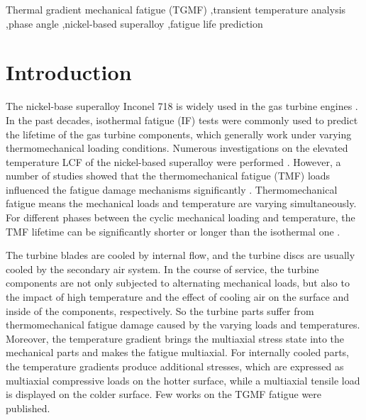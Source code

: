 \documentclass[preprint,5p,twocolumn,10pt,sort&compress]{elsarticle}
\begin{document}
\begin{frontmatter}
%
\begin{keyword}
Thermal gradient mechanical fatigue (TGMF) \sep transient temperature analysis \sep phase angle \sep nickel-based superalloy \sep fatigue life prediction

\end{keyword}
\end{frontmatter}

\section{Introduction}

The nickel-base superalloy Inconel 718 is widely used in the gas turbine engines \cite{Pollock2006}. In the past decades, isothermal fatigue (IF) tests were commonly used to predict the lifetime of the gas turbine components, which generally work under varying thermomechanical loading conditions. Numerous investigations on the elevated temperature LCF of the nickel-based superalloy were performed \cite{Koch85, Morrow88, Mahobia2014, Chen2016}. However, a number of studies showed that the thermomechanical fatigue (TMF) loads influenced the fatigue damage mechanisms significantly \cite{Evans2008, Bauer2009, Kulawinski2015, SCHLESINGER2017242, DENG2019813}. Thermomechanical fatigue means the mechanical loads and temperature are varying simultaneously. For different phases between the cyclic mechanical loading and temperature, the TMF lifetime can be significantly shorter or longer than the isothermal one \cite{SUN2019228}.

The turbine blades are cooled by internal flow, and the turbine discs are usually cooled by the secondary air system.
In the course of service, the turbine components are not only subjected to alternating mechanical loads, but also to the impact of high temperature and the effect of cooling air on the surface and inside of the components, respectively. So the turbine parts suffer from thermomechanical fatigue damage caused by the varying loads and temperatures.
Moreover, the temperature gradient brings the multiaxial stress state into the mechanical parts and makes the fatigue multiaxial.
For internally cooled parts, the temperature gradients produce additional stresses, which are expressed as multiaxial compressive loads on the hotter surface, while a multiaxial tensile load is displayed on the colder surface.
Few works on the TGMF fatigue were published.
\end{document}
